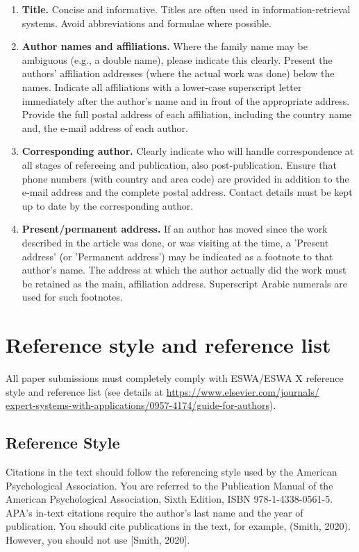 \documentclass[review]{elsarticle}
\begin{document}
\begin{enumerate}
    \item \textbf{Title.} Concise and informative. Titles are often used in information-retrieval systems. Avoid abbreviations and formulae where possible.
    \item \textbf{Author names and affiliations.} Where the family name may be ambiguous (e.g., a double name), please indicate this clearly. Present the authors' affiliation addresses (where the actual work was done) below the names. Indicate all affiliations with a lower-case superscript letter immediately after the author's name and in front of the appropriate address. Provide the full postal address of each affiliation, including the country name and, the e-mail address of each author.
    \item \textbf{Corresponding author.} Clearly indicate who will handle correspondence at all stages of refereeing and publication, also post-publication. Ensure that phone numbers (with country and area code) are provided in addition to the e-mail address and the complete postal address. Contact details must be kept up to date by the corresponding author.
    \item \textbf{Present/permanent address.} If an author has moved since the work described in the article was done, or was visiting at the time, a 'Present address' (or 'Permanent address') may be indicated as a footnote to that author's name. The address at which the author actually did the work must be retained as the main, affiliation address. Superscript Arabic numerals are used for such footnotes.
\end{enumerate}

\section{Reference style and reference list}
\label{reference_style}

All paper submissions must completely comply with ESWA/ESWA X reference style and reference list (see details at
\href{https://www.elsevier.com/journals/expert-systems-with-applications/0957-4174/guide-for-authors}{https://www.elsevier.com/journals/\\expert-systems-with-applications/0957-4174/guide-for-authors}).

\subsection{Reference Style}
Citations in the text should follow the referencing style used by the American Psychological Association. You are referred to the Publication Manual of the American Psychological Association, Sixth Edition, ISBN 978-1-4338-0561-5.  APA's in-text citations require the author's last name and the year of publication. You should cite publications in the text, for example, (Smith, 2020).  However, you should not use [Smith, 2020].
\end{document}

